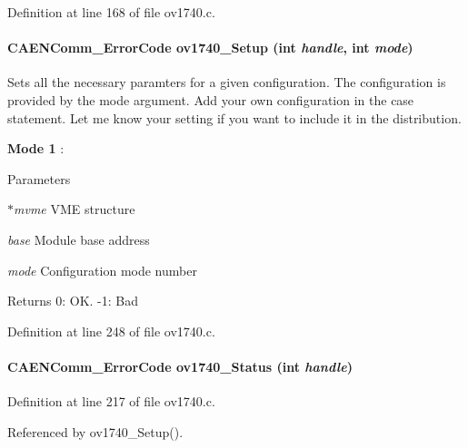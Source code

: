 Definition at line 168 of file ov1740.c.
\paragraph[{ov1740\_\-Setup}]{\setlength{\rightskip}{0pt plus 5cm}CAENComm\_\-ErrorCode ov1740\_\-Setup (int {\em handle}, \/  int {\em mode})}\hfill\label{ov1740drv_8h_a37458e8b4bbc712076b0b1e15c5241e9}
Sets all the necessary paramters for a given configuration. The configuration is provided by the mode argument. Add your own configuration in the case statement. Let me know your setting if you want to include it in the distribution.
\begin{DoxyItemize}
\item {\bfseries Mode 1} :
\end{DoxyItemize}


\begin{DoxyParams}{Parameters}
\item[{\em $\ast$mvme}]VME structure \item[{\em base}]Module base address \item[{\em mode}]Configuration mode number \end{DoxyParams}
\begin{DoxyReturn}{Returns}
0: OK. -\/1: Bad 
\end{DoxyReturn}


Definition at line 248 of file ov1740.c.
\paragraph[{ov1740\_\-Status}]{\setlength{\rightskip}{0pt plus 5cm}CAENComm\_\-ErrorCode ov1740\_\-Status (int {\em handle})}\hfill\label{ov1740drv_8h_ab985a5d9bfa3b1445514bada1a1303c3}


Definition at line 217 of file ov1740.c.

Referenced by ov1740\_\-Setup().
